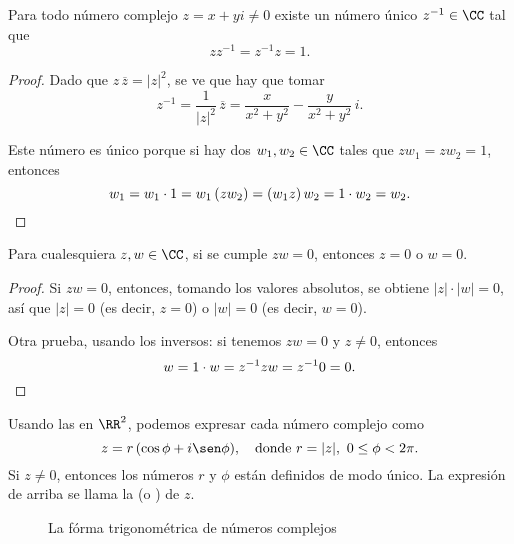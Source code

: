 \begin{observacion}
  Para todo número complejo $z = x+yi \ne 0$ existe un número único
  $z^{-1} \in \CC$ tal que
  $$z z^{-1} = z^{-1} z = 1.$$

  \begin{proof}
    Dado que $z\,\overline{z} = |z|^2$, se ve que hay que tomar
    $$z^{-1} = \frac{1}{|z|^2}\,\overline{z} = \frac{x}{x^2+y^2} - \frac{y}{x^2+y^2}\,i.$$

    Este número es único porque si hay dos $w_1, w_2 \in \CC$ tales que
    $z w_1 = z w_2 = 1$, entonces
    \[ w_1 = w_1\cdot 1 = w_1\,(z w_2) = (w_1 z)\, w_2 = 1\cdot w_2 = w_2. \qedhere \]
  \end{proof}
\end{observacion}

\begin{observacion}
  Para cualesquiera $z,w \in \CC$, si se cumple $zw = 0$, entonces $z = 0$ o
  $w = 0$.

  \begin{proof}
    Si $zw = 0$, entonces, tomando los valores absolutos, se obtiene
    $|z|\cdot |w| = 0$, así que $|z| = 0$ (es decir, $z = 0$) o $|w| = 0$
    (es decir, $w = 0$).

    Otra prueba, usando los inversos: si tenemos $zw = 0$ y $z \ne 0$, entonces
    \[ w = 1\cdot w = z^{-1}z w = z^{-1} 0 = 0. \qedhere \]
  \end{proof}
\end{observacion}

Usando las  en $\RR^2$, podemos expresar cada número
complejo como
$$z = r\,(\cos\phi + i\sen\phi), \quad \text{donde }r = |z|, ~ 0 \le \phi < 2\pi.$$
Si $z\ne 0$, entonces los números $r$ y $\phi$ están definidos de modo único.
La expresión de arriba se llama la  (o )
de $z$.

\begin{figure}[h]
  \begin{center}
  \end{center}

  \caption{La fórma trigonométrica de números complejos}
\end{figure}

